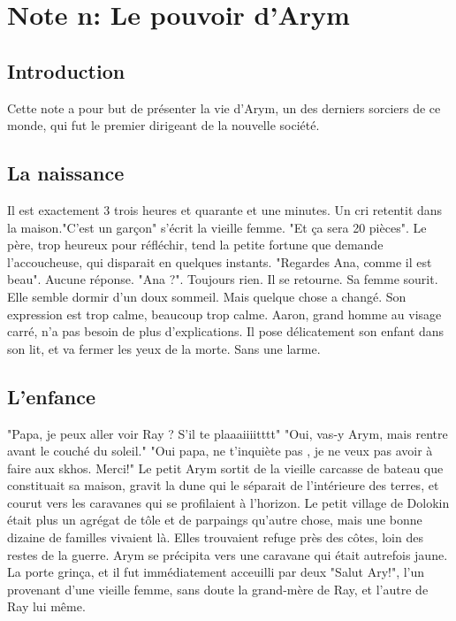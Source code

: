 \section{Note n: Le pouvoir d'Arym}
\subsection{Introduction}
Cette note a pour but de présenter la vie d'Arym, un des derniers sorciers de ce monde, qui fut le premier dirigeant de la nouvelle société.
\subsection{La naissance}
Il est exactement 3 trois heures et quarante et une minutes. Un cri retentit dans la maison."C'est un garçon" s'écrit la vieille femme. "Et ça sera 20 pièces". Le père, trop heureux pour réfléchir, tend la petite fortune que demande l'accoucheuse, qui disparait en quelques instants.
\newline
"Regardes Ana, comme il est beau". Aucune réponse. "Ana ?". Toujours rien. Il se retourne. Sa femme sourit. Elle semble dormir d'un doux sommeil. Mais quelque chose a changé. Son expression est trop calme, beaucoup trop calme. Aaron, grand homme au visage carré, n'a pas besoin de plus d'explications. Il pose délicatement son enfant dans son lit, et va fermer les yeux de la morte. Sans une larme.
\subsection{L'enfance}
"Papa, je peux aller voir Ray ? S'il te plaaaiiiitttt"
\newline
"Oui, vas-y Arym, mais rentre avant le couché du soleil."
\newline
"Oui papa, ne t'inquiète pas , je ne veux pas avoir à faire aux skhos. Merci!"
\newline
Le petit Arym sortit de la vieille carcasse de bateau que constituait sa maison, gravit la dune qui le séparait de l'intérieure des terres, et courut vers les caravanes qui se profilaient à l'horizon. Le petit village de Dolokin était plus un agrégat de tôle et de parpaings qu'autre chose, mais une bonne dizaine de familles vivaient là. Elles trouvaient refuge près des côtes, loin des restes de la guerre.
\newline
Arym se précipita vers une caravane qui était autrefois jaune. La porte grinça, et il fut immédiatement acceuilli par deux "Salut Ary!", l'un provenant d'une vieille femme, sans doute la grand-mère de Ray, et l'autre de Ray lui même. 
